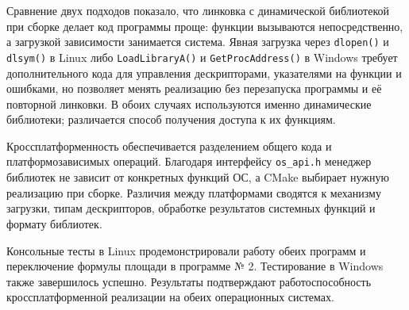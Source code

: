 \documentclass[12pt,a4paper]{article}
\begin{document}
Сравнение двух подходов показало, что линковка с динамической библиотекой при сборке делает код программы проще: функции вызываются непосредственно, а загрузкой зависимости занимается система. Явная загрузка через \texttt{dlopen()} и \texttt{dlsym()} в Linux либо \texttt{LoadLibraryA()} и \texttt{GetProcAddress()} в Windows требует дополнительного кода для управления дескрипторами, указателями на функции и ошибками, но позволяет менять реализацию без перезапуска программы и её повторной линковки. В обоих случаях используются именно динамические библиотеки; различается способ получения доступа к их функциям.

Кроссплатформенность обеспечивается разделением общего кода и платформозависимых операций. Благодаря интерфейсу \texttt{os\_api.h} менеджер библиотек не зависит от конкретных функций ОС, а CMake выбирает нужную реализацию при сборке. Различия между платформами сводятся к механизму загрузки, типам дескрипторов, обработке результатов системных функций и формату библиотек.

Консольные тесты в Linux продемонстрировали работу обеих программ и переключение формулы площади в программе № 2. Тестирование в Windows также завершилось успешно. Результаты подтверждают работоспособность кроссплатформенной реализации на обеих операционных системах.
\end{document}
